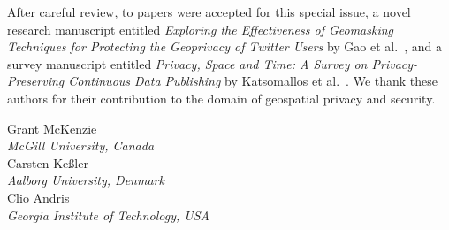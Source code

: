 \documentclass{josised}
\begin{document}
After careful review, to papers were accepted for this special issue, a novel research manuscript entitled \textit{Exploring the Effectiveness of Geomasking Techniques for Protecting the Geoprivacy of Twitter Users} by Gao et al.~\cite{gao2019exploring}, and a survey manuscript entitled \textit{Privacy, Space and Time: A Survey on Privacy-Preserving Continuous Data Publishing} by Katsomallos et al.~\cite{katsomallos2019privacy}.  We thank these authors for their contribution to the domain of geospatial privacy and security.



\bigskip

\bigskip

\begin{raggedleft}
Grant McKenzie\\
\textit{McGill University, Canada} \\
\bigskip
Carsten Ke{\ss}ler\\
\textit{Aalborg University, Denmark} \\
\bigskip
Clio Andris\\
\textit{Georgia Institute of Technology, USA} \\






\end{raggedleft}
\end{document}
